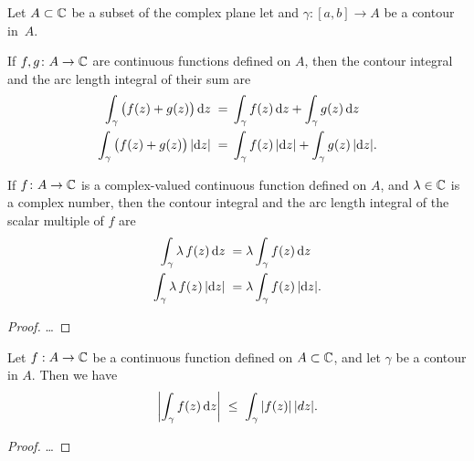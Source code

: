 \begin{lemma}
  \label{lem:integral_linearity}

  Let $A \subset \mathbb{C}$ be a subset of the complex plane let and $\gamma \colon [a,b] \to A$
  be a contour in~$A$.

  If $f, g \colon A \to \mathbb{C}$ are continuous
  functions defined on $A$, then the contour integral
  and the arc length integral of their sum are
  \begin{align*}
    \int_\gamma \big( f(z) + g(z) \big) \, \mathrm{d} z
      \; = \; & \int_\gamma f(z) \, \mathrm{d} z + \int_\gamma g(z) \, \mathrm{d} z \\
    \int_\gamma \big( f(z) + g(z) \big) \, |\mathrm{d} z|
      \; = \; & \int_\gamma f(z) \, |\mathrm{d} z| + \int_\gamma g(z) \, |\mathrm{d} z| .
  \end{align*}

  If $f \colon A \to \mathbb{C}$ is a complex-valued continuous
  function defined on $A$,
  and $\lambda \in \mathbb{C}$ is a complex number, then the contour
  integral and the arc length integral of the scalar multiple of $f$ are
  \begin{align*}
    \int_\gamma \lambda \, f(z) \, \mathrm{d} z
      \; = \; & \lambda \int_\gamma f(z) \, \mathrm{d} z \\
    \int_\gamma \lambda \, f(z) \, |\mathrm{d} z|
      \; = \; & \lambda \int_\gamma f(z) \, |\mathrm{d} z| .
  \end{align*}
\end{lemma}
\begin{proof}
  \ldots
\end{proof}

\begin{lemma}
  \label{lem:integral_triangle_inequality}
  Let $f : A \to \mathbb{C}$ be a continuous function defined on $A \subset \mathbb{C}$,
  and let $\gamma$ be a contour in $A$. Then we have
  \begin{align*}
    \left| \int_\gamma f(z) \, \mathrm{d} z \right| \; \le \; \int_\gamma |f(z)| \, |dz| .
  \end{align*}
\end{lemma}
\begin{proof}
  \ldots
\end{proof}

